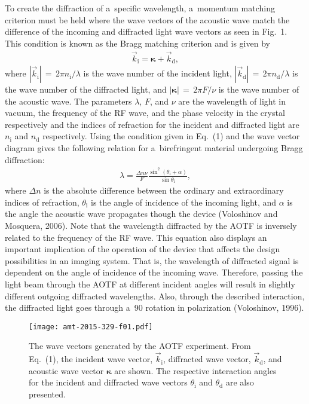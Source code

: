 \documentclass[amt]{copernicus}
\begin{document}
To create the diffraction of a~specific wavelength, a~momentum matching
criterion must be held where the wave vectors of the acoustic wave match the
difference of the incoming and diffracted light wave vectors as seen in
Fig.~1. This condition is known as the Bragg matching criterion and is given
by
\begin{align}
\vec{k}_{\mathrm{i}}=\boldsymbol{\kappa} +\vec{k}_{\mathrm{d}},
\end{align}
where $\left| \vec{k}_{\mathrm{i}} \right|\,=\,2\pi
n_{\mathrm{i}}/\lambda$ is the wave number of the incident light,
$\left| \vec{k}_{\mathrm{d}} \right|\,=\,2\pi n_{\mathrm{d}}/\lambda$
is the wave number of the diffracted light, and $\left|
  \boldsymbol{\kappa} \right|\,=\,2\pi F/\nu$ is the wave number of
the acoustic wave. The parameters $\lambda$, $F$, and $\nu$ are the
wavelength of light in vacuum, the frequency of the RF wave, and the
phase velocity in the crystal respectively and the indices of
refraction for the incident and diffracted light are $n_{\mathrm{i}}$
and $n_{\mathrm{d}}$ respectively. Using the condition given in
Eq.~(1) and the wave vector diagram gives the following relation for
a~birefringent material undergoing Bragg diffraction:
\begin{align}
\lambda =\frac{\Delta n\nu} {F}\frac{\sin^{2}\left(\theta
_{\mathrm{i}}+\alpha \right)}{\sin \theta_{\mathrm{i}}},
\end{align}
where $\Delta n$ is the absolute difference between the
ordinary and extraordinary indices of refraction,
$\theta_{\mathrm{i}}$ is the angle of incidence of the incoming light,
and $\alpha$ is the angle the acoustic wave propagates though the
device (Voloshinov and Mosquera, 2006). Note that the wavelength
diffracted by the AOTF is inversely related to the frequency of the RF
wave. This equation also displays an important implication of the
operation of the device that affects the design possibilities in an
imaging system. That is, the wavelength of diffracted signal is
dependent on the angle of incidence of the incoming wave. Therefore,
passing the light beam through the AOTF at different incident angles
will result in slightly different outgoing diffracted
wavelengths. Also, through the described interaction, the diffracted
light goes through a~90{\degree} rotation in polarization (Voloshinov,
1996).

\begin{figure}[t]
\texttt{[image: amt-2015-329-f01.pdf]}
\caption{The wave vectors generated by the AOTF experiment. From
  Eq.~(1), the incident wave vector, $\vec{k}_{\mathrm{i}}$,
  diffracted wave vector, $\vec{k}_{\mathrm{d}}$, and acoustic wave
  vector $\boldsymbol{\kappa}$ are shown. The respective interaction
  angles for the incident and diffracted wave vectors
  $\theta_{\mathrm{i}}$ and $\theta_{\mathrm{d}}$ are also presented.}
\end{figure}
\end{document}
